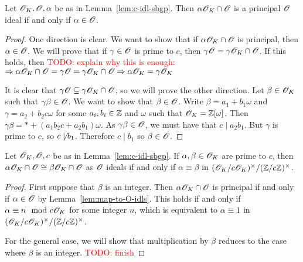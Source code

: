 \documentclass{amsart}
\begin{document}
\begin{lemma}\label{lem:map-to-O-idls}
  Let $\mathscr{O}_K,\mathscr{O},\alpha$ be as in Lemma~\ref{lem:c-idl-sbgp}. Then $\alpha\mathscr{O}_K \cap \mathscr{O}$ is a principal $\mathscr{O}$ ideal if and only if $\alpha \in \mathscr{O}$.
\end{lemma}
\begin{proof}
  One direction is clear. We want to show that if $\alpha\mathscr{O}_K \cap \mathscr{O}$ is principal, then $\alpha \in \mathscr{O}$. We will prove that if $\gamma \in \mathscr{O}$ is prime to $c$, then $\gamma\mathscr{O} = \gamma\mathscr{O}_K \cap \mathscr{O}$. If this holds, then \textcolor{red}{TODO: explain why this is enough: $\Rightarrow \alpha\mathscr{O}_K \cap \mathscr{O} = \gamma\mathscr{O} = \gamma\mathscr{O}_K \cap \mathscr{O} \Rightarrow \alpha\mathscr{O}_K = \gamma\mathscr{O}_K$}

  It is clear that $\gamma\mathscr{O} \subseteq \gamma\mathscr{O}_K \cap \mathscr{O}$, so we will prove the other direction. Let $\beta \in \mathscr{O}_K$ such that $\gamma\beta \in \mathscr{O}$. We want to show that $\beta \in \mathscr{O}$. Write $\beta = a_1 + b_1\omega$ and $\gamma = a_2 + b_2c\omega$ for some $a_i,b_i \in \mathbb{Z}$ and $\omega$ such that $\mathscr{O}_K = \mathbb{Z}[\omega]$. Then $\gamma\beta = \ast + (a_1b_2c + a_2b_1)\omega$. As $\gamma\beta \in \mathscr{O}$, we must have that $c \mid a_2b_1$. But $\gamma$ is prime to $c$, so $c \not\mid b_1$. Therefore $c \mid b_1$ so $\beta \in \mathscr{O}$.
\end{proof}

\begin{lemma}\label{lem:ideal-equiv}
  Let $\mathscr{O}_K,\mathscr{O},c$ be as in Lemma~\ref{lem:c-idl-sbgp}. If $\alpha,\beta \in \mathscr{O}_K$ are prime to $c$, then $\alpha\mathscr{O}_K \cap \mathscr{O} \cong \beta\mathscr{O}_K \cap \mathscr{O}$ as $\mathscr{O}$ ideals if and only if $\alpha \equiv \beta$ in $(\mathscr{O}_K/c\mathscr{O}_K)^\times/(\mathbb{Z}/c\mathbb{Z})^\times$.
\end{lemma}
\begin{proof}
  First suppose that $\beta$ is an integer. Then $\alpha\mathscr{O}_K \cap \mathscr{O}$ is principal if and only if $\alpha \in \mathscr{O}$ by Lemma~\ref{lem:map-to-O-idls}. This holds if and only if $\alpha \equiv n \mod{c\mathscr{O}_K}$ for some integer $n$, which is equivalent to $\alpha \equiv 1$ in $(\mathscr{O}_K/c\mathscr{O}_K)^\times/(\mathbb{Z}/c\mathbb{Z})^\times$.

  For the general case, we will show that multiplication by $\overline{\beta}$ reduces to the case where $\beta$ is an integer. \textcolor{red}{TODO: finish}
\end{proof}
\end{document}
